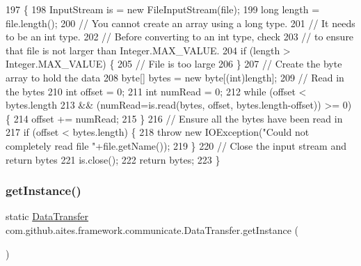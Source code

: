 \begin{DoxyCode}
197                                                                         \{
198          InputStream is = \textcolor{keyword}{new} FileInputStream(file);
199          \textcolor{keywordtype}{long} length = file.length();
200          \textcolor{comment}{// You cannot create an array using a long type.}
201          \textcolor{comment}{// It needs to be an int type.}
202          \textcolor{comment}{// Before converting to an int type, check}
203          \textcolor{comment}{// to ensure that file is not larger than Integer.MAX\_VALUE.}
204          \textcolor{keywordflow}{if} (length > Integer.MAX\_VALUE) \{
205              \textcolor{comment}{// File is too large}
206          \}
207          \textcolor{comment}{// Create the byte array to hold the data}
208          byte[] bytes = \textcolor{keyword}{new} byte[(int)length];
209          \textcolor{comment}{// Read in the bytes}
210          \textcolor{keywordtype}{int} offset = 0;
211          \textcolor{keywordtype}{int} numRead = 0;
212          \textcolor{keywordflow}{while} (offset < bytes.length
213                 && (numRead=is.read(bytes, offset, bytes.length-offset)) >= 0) \{
214              offset += numRead;
215          \}
216          \textcolor{comment}{// Ensure all the bytes have been read in}
217          \textcolor{keywordflow}{if} (offset < bytes.length) \{
218              \textcolor{keywordflow}{throw} \textcolor{keyword}{new} IOException(\textcolor{stringliteral}{"Could not completely read file "}+file.getName());
219          \}
220          \textcolor{comment}{// Close the input stream and return bytes}
221          is.close();
222          \textcolor{keywordflow}{return} bytes;
223      \}
\end{DoxyCode}
\mbox{\label{classcom_1_1github_1_1aites_1_1framework_1_1communicate_1_1_data_transfer_a0add9f40d6822234a5ac9f3412ede673}} 
\subsubsection{\texorpdfstring{get\+Instance()}{getInstance()}}
{\footnotesize\ttfamily static \mbox{\hyperlink{classcom_1_1github_1_1aites_1_1framework_1_1communicate_1_1_data_transfer}{Data\+Transfer}} com.\+github.\+aites.\+framework.\+communicate.\+Data\+Transfer.\+get\+Instance (\begin{DoxyParamCaption}{ }\end{DoxyParamCaption})\hspace{0.3cm}{\ttfamily [static]}}



